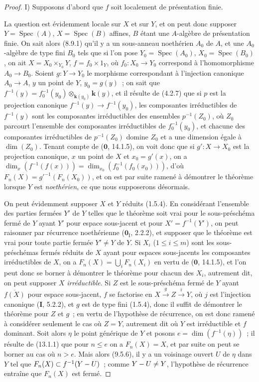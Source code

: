 \begin{proof}
I) Supposons d'abord que $f$ soit localement de présentation finie.

La question est évidemment locale sur $X$ et sur $Y$, et on peut donc supposer
$Y=\operatorname{Spec}(A)$, $X=\operatorname{Spec}(B)$ affines, $B$ étant une
$A$-algèbre de présentation finie. On sait alors (8.9.1) qu'il y a un
sous-anneau noethérien $A_0$ de $A$, et une $A_0$-algèbre de type fini $B_0$
tels que si l'on pose $Y_0=\operatorname{Spec}(A_0)$,
$X_0=\operatorname{Spec}(B_0)$, on ait $X=X_0\times_{Y_0}Y$, $f=f_0\times 1_Y$,
où $f_0:X_0\to Y_0$ correspond à l'homomorphisme $A_0\to B_0$. Soient
$g:Y\to Y_0$ le morphisme correspondant à l'injection canonique $A_0\to A$,
$y$ un point de $Y$, $y_0=g(y)$~; on sait que
$f^{-1}(y)=f_0^{-1}(y_0)\otimes_{\mathbf{k}(y_0)}\boldsymbol{k}(y)$, et il résulte de (4.2.7) que
si $p$ est la projection canonique $f^{-1}(y)\to f^{-1}(y_0)$, les
composantes irréductibles de $f^{-1}(y)$ sont les composantes irréductibles des
ensembles $p^{-1}(Z_0)$, où $Z_0$ parcourt l'ensemble des composantes
irréductibles de $f_0^{-1}(y_0)$, et chacune des composantes irréductibles de
$p^{-1}(Z_0)$ domine $Z_0$ et a une dimension égale à $\dim(Z_0)$. Tenant
compte de ($\mathbf 0$, 14.1.5), on voit donc que si $g':X\to X_0$ est la
projection canonique, $x$ un point de $X$ et $x_0=g'(x)$, on a
$\dim_x(f^{-1}(f(x)))=\dim_{x_0}(f_0^{-1}(f_0(x_0)))$, d'où
$F_n(X)=g'^{-1}(F_n(X_0))$, et on est par suite ramené à démontrer le théorème
lorsque $Y$ est \emph{noethérien}, ce que nous supposerons désormais.

On peut évidemment supposer $X$ et $Y$ réduits (1.5.4). En considérant
l'ensemble des parties fermées $Y'$ de $Y$ telles que le théorème soit vrai
pour le sous-préschéma fermé de $Y$ ayant $Y'$ pour espace sous-jacent et pour
$X'=f^{-1}(Y')$, on peut raisonner par récurrence noethérienne
($\mathbf 0_{\mathrm I}$, 2.2.2), et supposer que le théorème est vrai pour
toute partie fermée $Y'\neq Y$ de $Y$. Si $X_i$ ($1\leq i\leq m$) sont les
sous-préschémas fermés réduits de $X$ ayant pour espaces sous-jacents les
composantes irréductibles de $X$, on a $F_n(X)=\bigcup_iF_n(X_i)$ en vertu de
($\mathbf 0$, 14.1.5), et l'on peut donc se borner à démontrer le théorème pour
chacun des $X_i$, autrement dit, on peut supposer $X$ \emph{irréductible}. Si $Z$ est
le sous-préschéma fermé de $Y$ ayant $\overline{f(X)}$ pour espace sous-jacent,
$f$ se factorise en $X\xrightarrow{g}Z\xrightarrow{i}Y$, où $j$ est
l'injection canonique (\textbf{I}, 5.2.2), et $g$ est de type fini (1.5.4),
donc il suffit de démontrer le théorème pour $Z$ et $g$~; en vertu de
l'hypothèse de récurrence, on est donc ramené à considérer seulement le cas où
$Z=Y$, autrement dit où $Y$ est irréductible et $f$ dominant. Soit alors
$\eta$ le point générique de $Y$ et posons $e=\dim(f^{-1}(\eta))$~; il résulte
de (13.1.1) que pour $n\leq e$ on a $F_n(X)=X$, et par suite on peut se borner
au cas où $n>e$. Mais alors (9.5.6), il y a un voisinage ouvert $U$ de $\eta$
dans $Y$ tel que $F_n(X)\subset f^{-1}(Y- U)$~; comme $Y- U\neq Y$, l'hypothèse
de récurrence entraîne que $F_n(X)$ est fermé.


\end{proof}
